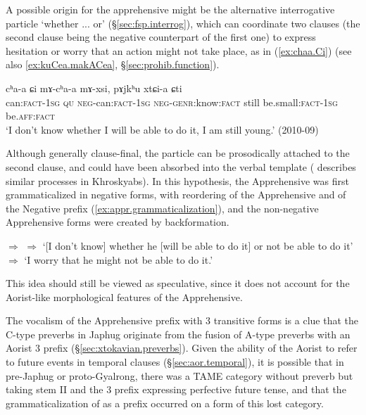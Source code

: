 A possible origin for the apprehensive  might be the alternative interrogative particle  `whether ... or' (§\ref{sec:fsp.interrog}), which can coordinate two clauses (the second clause being the negative counterpart of the first one) to express hesitation or worry that an action might not take place, as in (\ref{ex:chaa.Ci}) (see also  \ref{ex:kuCea.makACea}, §\ref{sec:prohib.function}).
 
 \begin{exe}
\ex \label{ex:chaa.Ci}
\gll  cʰa-a ɕi mɤ-cʰa-a mɤ-xsi, pɤjkʰu xtɕi-a ɕti \\
can:\textsc{fact}-\textsc{1sg} \textsc{qu} \textsc{neg}-can:\textsc{fact}-\textsc{1sg} \textsc{neg}-\textsc{genr}:know:\textsc{fact} still be.small:\textsc{fact}-\textsc{1sg} be.\textsc{aff}:\textsc{fact} \\
\glt `I don't know whether I will be able to do it, I am still young.' (2010-09)
\end{exe}
  
Although generally clause-final, the particle    can be prosodically attached to the second clause, and could have been absorbed into the verbal template (\citealt{laiyf20betrayal} describes similar processes in Khroskyabs). In this hypothesis, the Apprehensive was first grammaticalized in negative forms, with reordering of the Apprehensive and of the Negative prefix (\ref{ex:appr.grammaticalization}), and the non-negative Apprehensive forms were created by backformation.

 \begin{exe}
\ex \label{ex:appr.grammaticalization}
\glt {} $\Rightarrow$  $\Rightarrow$  
\glt `[I don't know] whether he [will be able to do it] or not be able to do it' $\Rightarrow$ `I worry that he might not be able to do it.' 
\end{exe}

This idea should still be viewed as speculative, since it does not account for the Aorist-like morphological features of the Apprehensive. 

The  vocalism of the Apprehensive prefix with 3\flobv{} transitive forms is a clue that the C-type preverbs in Japhug originate from the fusion of A-type  preverbs with an Aorist 3\flobv{}  prefix (§\ref{sec:xtokavian.preverbs}). Given the ability of the Aorist to refer to future events in temporal clauses (§\ref{sec:aor.temporal}), it is possible that in pre-Japhug or proto-Gyalrong, there was a TAME category without preverb but taking stem II and the 3\flobv{}  prefix expressing perfective future tense, and that the grammaticalization of  as a prefix occurred on a form of this lost category.

